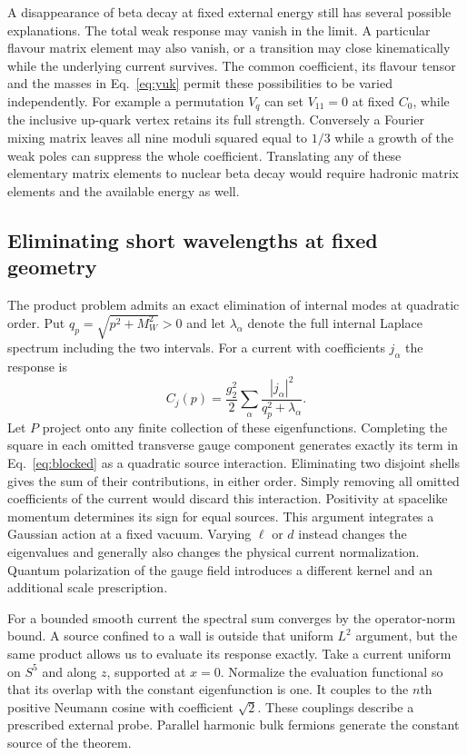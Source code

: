 \documentclass[aps,prd,reprint,onecolumn,nofootinbib,amsmath,amssymb]{revtex4-2}
\begin{document}
A disappearance of beta decay at fixed external energy still has several possible explanations. The total weak response may vanish in the limit. A particular flavour matrix element may also vanish, or a transition may close kinematically while the underlying current survives. The common coefficient, its flavour tensor and the masses in Eq.~\eqref{eq:yuk} permit these possibilities to be varied independently. For example a permutation $V_q$ can set $V_{11}=0$ at fixed $C_0$, while the inclusive up-quark vertex retains its full strength. Conversely a Fourier mixing matrix leaves all nine moduli squared equal to $1/3$ while a growth of the weak poles can suppress the whole coefficient. Translating any of these elementary matrix elements to nuclear beta decay would require hadronic matrix elements and the available energy as well.

\subsection{Eliminating short wavelengths at fixed geometry}
The product problem admits an exact elimination of internal modes at quadratic order. Put $q_p=\sqrt{p^2+M_W^2}>0$ and let $\lambda_\alpha$ denote the full internal Laplace spectrum including the two intervals. For a current with coefficients $j_\alpha$ the response is
\begin{equation}
 C_j(p)=\frac{g_2^2}{2}
         \sum_\alpha\frac{|j_\alpha|^2}{q_p^2+\lambda_\alpha}.
 \label{eq:blocked}
\end{equation}
Let $P$ project onto any finite collection of these eigenfunctions. Completing the square in each omitted transverse gauge component generates exactly its term in Eq.~\eqref{eq:blocked} as a quadratic source interaction. Eliminating two disjoint shells gives the sum of their contributions, in either order. Simply removing all omitted coefficients of the current would discard this interaction. Positivity at spacelike momentum determines its sign for equal sources. This argument integrates a Gaussian action at a fixed vacuum. Varying $\ell$ or $d$ instead changes the eigenvalues and generally also changes the physical current normalization. Quantum polarization of the gauge field introduces a different kernel and an additional scale prescription.

For a bounded smooth current the spectral sum converges by the operator-norm bound. A source confined to a wall is outside that uniform $L^2$ argument, but the same product allows us to evaluate its response exactly. Take a current uniform on $S^5$ and along $z$, supported at $x=0$. Normalize the evaluation functional so that its overlap with the constant eigenfunction is one. It couples to the $n$th positive Neumann cosine with coefficient $\sqrt2$. These couplings describe a prescribed external probe. Parallel harmonic bulk fermions generate the constant source of the theorem.
\end{document}
